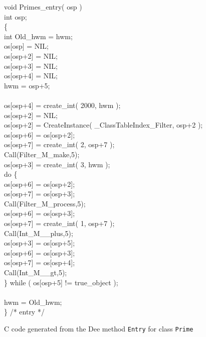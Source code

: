 \begin{shortfigure}
\begin{prog}
\>      void Primes\_entry( osp )               \\
\>\>		int osp;                        \\
\>	\{                                       \\
\>\>	  int Old\_hwm = hwm;                   \\
\>\>	  os[osp] = NIL;                        \\
\>\>	  os[osp+2] = NIL;                      \\
\>\>	  os[osp+3] = NIL;                      \\
\>\> 	  os[osp+4] = NIL;                      \\
\>\>      hwm = osp+5;                          \\
\>                                              \\
\>\>      os[osp+4] = create\_int( 2000, hwm ); \\
\>\>      os[osp+2] = NIL;                      \\
\>\>      os[osp+2] = CreateInstance( \_ClassTableIndex\_Filter, osp+2 ); \\
\>\>      os[osp+6] = os[osp+2];                \\
\>\>      os[osp+7] = create\_int( 2, osp+7 );  \\
\>\>      Call(Filter\_M\_make,5);              \\
\>\>      os[osp+3] = create\_int( 3, hwm );    \\
\>\>      do \{                                  \\
\>\>\>      os[osp+6] = os[osp+2];              \\
\>\>\>      os[osp+7] =  os[osp+3];             \\
\>\>\>      Call(Filter\_M\_process,5);         \\
\>\>\>      os[osp+6] = os[osp+3];              \\
\>\>\>      os[osp+7] = create\_int( 1, osp+7 );\\
\>\>\>      Call(Int\_M\_\_plus,5);             \\
\>\>\>      os[osp+3] = os[osp+5];              \\
\>\>\>      os[osp+6] = os[osp+3];              \\
\>\>\>      os[osp+7] =  os[osp+4];             \\
\>\>\>      Call(Int\_M\_\_gt,5);               \\
\>\>      \} while ( os[osp+5] != true\_object );\\
\>                                              \\
\>\>      hwm = Old\_hwm;                       \\
\>      \}  /* entry */                         
\end{prog}                    
\caption{C code generated from the Dee method {\tt Entry} for class
{\tt Prime}}
\label{fig:cmeth}
\end{shortfigure}

